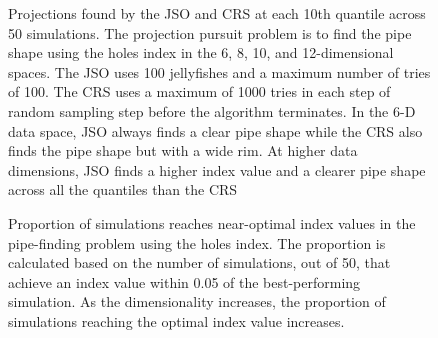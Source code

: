 \documentclass[
  number,
  preprint,
  3p]{elsarticle}
\begin{document}
\begin{figure}


\caption{\label{fig-proj}Projections found by the JSO and CRS at each
10th quantile across 50 simulations. The projection pursuit problem is
to find the pipe shape using the holes index in the 6, 8, 10, and
12-dimensional spaces. The JSO uses 100 jellyfishes and a maximum number
of tries of 100. The CRS uses a maximum of 1000 tries in each step of
random sampling step before the algorithm terminates. In the 6-D data
space, JSO always finds a clear pipe shape while the CRS also finds the
pipe shape but with a wide rim. At higher data dimensions, JSO finds a
higher index value and a clearer pipe shape across all the quantiles
than the CRS}

\end{figure}%

\begin{figure}


\caption{\label{fig-proportion}Proportion of simulations reaches
near-optimal index values in the pipe-finding problem using the holes
index. The proportion is calculated based on the number of simulations,
out of 50, that achieve an index value within 0.05 of the
best-performing simulation. As the dimensionality increases, the
proportion of simulations reaching the optimal index value increases.}

\end{figure}%
\end{document}
